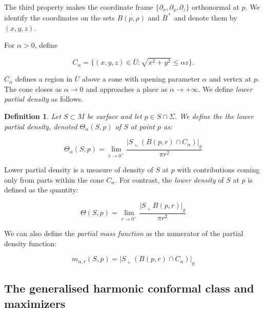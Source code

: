 \documentclass{amsart}
\newtheorem{definition}{Definition}
\theoremstyle{named}
\begin{document}
The third property makes the coordinate frame $\{ \partial_{x}, \partial_{y}, \partial_{z} \}$ orthonormal at $p$. We identify the coordinates on the sets $\overline{B(p, \rho)}$ and $\overline{B}^{+}$ and denote them by $(x,y,z)$.  

For $\alpha > 0$, define

\begin{equation*}
    C_{\alpha} = \{ (x,y,z) \in \overline{U}: \sqrt{x^2 + y^2} \leq \alpha z \}.
\end{equation*}

$C_{\alpha}$ defines a region in $\overline{U}$ above a cone with opening parameter $\alpha$ and vertex at $p$. The cone closes as $\alpha \rightarrow 0$ and approaches a place as $\alpha \rightarrow +\infty$. We define \textit{lower partial density} as follows.

\begin{definition}
    Let $S \subset M$ be surface and let $p \in S \cap \Sigma$. We define the the lower partial density, denoted $\Theta_{\alpha}(S,p)$ of $S$ at point $p$ as:

    \begin{equation*}
        \Theta_{\alpha}(S,p) = \lim\limits_{r \rightarrow 0^{+}} \frac{|S \llcorner (B(p,r) \cap C_{\alpha})|_g}{\pi r^2}
    \end{equation*}
    
\end{definition}

Lower partial density is a measure of density of $S$ at $p$ with contributions coming only from parts within the cone $C_{\alpha}$. For contrast, the \textit{lower density} of $S$ at $p$ is defined as the quantity:

\begin{equation*}
    \Theta(S,p) = \lim\limits_{r \rightarrow 0^{+}} \frac{|S \llcorner B(p,r)|_g}{\pi r^2}
\end{equation*}

We can also define the \textit{partial mass function} as the numerator of the partial density function:

\begin{equation} \nonumber
    m_{\alpha,r}(S,p) = |S \llcorner (B(p,r) \cap C_{\alpha})|_g 
\end{equation}
    


\subsection{The generalised harmonic conformal class and maximizers}
\end{document}
